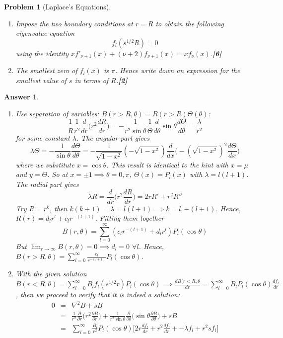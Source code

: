 \documentclass[a4paper]{article}
\newtheorem{ans}{Answer}[section]
\theoremstyle{new}
\newtheorem{qns}{Problem}[section]
\begin{document}
\begin{qns}[Laplace's Equations]
\begin{enumerate}[label=(\roman*)]
\begin{mdframed}
\textcolor{darkblue}{Hint: Note that the second solution to this equation is singular at $r = 0$ but $f_l$ is bounded at $r = 0$.}
\end{mdframed}
\item Impose the two boundary conditions at $r = R$ to obtain the following eigenvalue equation
$$f_l(s^{1/2} R) = 0$$
using the identity $xf'_{\nu+1}(x)+(\nu+2)f_{\nu+1}(x)=xf_\nu(x)$.\hfill\textbf{[6]}
\item The smallest zero of $f_l(x)$ is $\pi$. Hence write down an expression for the smallest value of $s$ in terms of $R$.\hfill\textbf{[2]}
\end{enumerate}
\end{qns}
\begin{ans}\leavevmode
\begin{enumerate}[label=(\roman*)]
\item Use separation of variables: $B(r>R,\theta)=R(r>R)\Theta(\theta)$:
$$\frac{1}{R}\frac{1}{r^2}\frac{d}{dr}\bigg(r^2\frac{dR}{dr}\bigg)=-\frac{1}{r^2\sin\theta}\frac{1}{\Theta}\frac{d}{d\theta}\sin\theta\frac{d\Theta}{d\theta}=\frac{\lambda}{r^2}$$
for some constant $\lambda$. The angular part gives
$$\lambda\Theta=-\frac{1}{\sin\theta}\frac{d\Theta}{d\theta}=-\frac{1}{\sqrt{1-x^2}}(-\sqrt{1-x^2})\frac{d}{dx}\bigg(-(\sqrt{1-x^2})^2\frac{d\Theta}{dx}\bigg)$$
where we substitute $x=\cos\theta$. This result is identical to the hint with $x=\mu$ and $y=\Theta$. So at $x=\pm1\implies\theta=0,\pi$, $\Theta(x)=P_l(x)$ with $\lambda=l(l+1)$. The radial part gives
$$\lambda R=\frac{d}{dr}\bigg(r^2\frac{dR}{dr}\bigg)=2rR'+r^2R''$$
Try $R=r^k$, then $k(k+1)=\lambda=l(l+1)\implies k=l,-(l+1)$. Hence, $R(r)=d_lr^l+c_lr^{-(l+1)}$. Fitting them together
$$B(r,\theta)=\sum_{l=0}^\infty(c_lr^{-(l+1)}+d_lr^l)P_l(\cos\theta)$$
But $\lim_{r\rightarrow\infty}B(r,\theta)=0\implies d_l=0$ $\forall l$. Hence, $B(r>R,\theta)=\sum_{l=0}^\infty\frac{c_l}{r^{-(l+1)}}P_l(\cos\theta)$.
\item With the given solution $B(r<R,\theta)=\sum_{l=0}^\infty B_lf_l(s^{1/2}r)P_l(\cos\theta)\implies\frac{dB(r<R,\theta}{dr}=\sum_{l=0}^\infty B_lP_l(\cos\theta)\frac{df_l}{dr}$, then we proceed to verify that it is indeed a solution:
\begin{eqnarray}
0&=&\nabla^2B+sB\nonumber\\&=&\frac{1}{r^2}\frac{\partial}{\partial r}\bigg(r^2\frac{\partial B}{\partial r}\bigg)+\frac{1}{r^2\sin\theta}\frac{\partial}{\partial\theta}\bigg(\sin\theta\frac{\partial B}{\partial\theta}\bigg)+sB\nonumber\\&=&\sum_{l=0}^\infty\frac{B_l}{r^2}P_l(\cos\theta)\bigg[2r\frac{df_l}{dr}+r^2\frac{df_l}{dr}+-\lambda f_l+r^2sf_l\bigg]\nonumber

\end{eqnarray}
\end{enumerate}
\end{ans}
\end{document}
